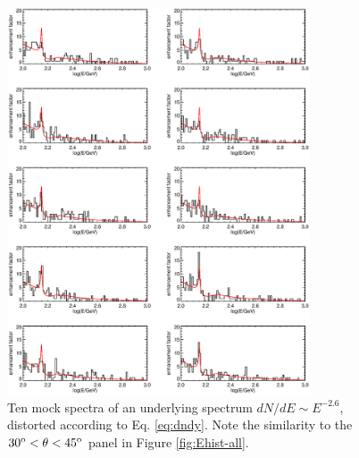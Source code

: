 \documentclass[aps,twocolumn,prd,superscriptaddress,showpacs,nofootinbib,fixfloat]{revtex4}
\newcommand{\degree}{^{\rm o}}
\begin{document}
\begin{figure}
  \centering
  \includegraphics[width=0.8\textwidth]{plots/limb_bump_model_many.ps}
  \caption{Ten mock spectra of an underlying spectrum $dN/dE
  \sim E^{-2.6}$, distorted according to Eq. \ref{eq:dndy}.
  Note the similarity to the $30\degree < \theta <
  45\degree$ panel in Figure \ref{fig:Ehist-all}.}
  \label{fig:bumpmodelmany}
\end{figure}
\end{document}
